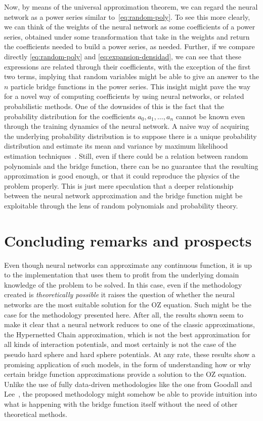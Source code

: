 Now, by means of the universal approximation theorem, we can regard the neural network
as a power series similar to~\eqref{eq:random-poly}. To see this more clearly, we
can think of the weights of the neural network as some coefficients of a power series,
obtained under some transformation that take in the weights and return the coefficients
needed to build a power series, as needed.
Further, if we compare directly \autoref{eq:random-poly}
and \autoref{eq:expansion-densidad}, we can see that these expressions
are related through their coefficients, with the exception of the first two terms, implying 
that random variables might be able to give an answer to the $n$ particle bridge functions 
in the power series.
This insight might pave the way for a novel way of computing coefficients
by using neural networks, or related probabilistic methods.
One of the downsides of this is the fact that the probability
distribution for the coefficients $a_0, a_1, \dots , a_n$ cannot be known even through the
training dynamics of the neural network. A naive way of acquiring the underlying 
probability distribution is to suppose there is
a unique probability distribution and estimate its mean and variance by maximum likelihood
estimation techniques~\cite{hastieElementsStatisticalLearning2009}.
Still, even if there could be a relation between random polynomials and the bridge 
function, there can be no guarantee that the resulting approximation is good enough, or 
that it could reproduce the physics of the problem properly.
This is just mere speculation that a deeper relationship between the neural network 
approximation and the bridge function might be exploitable through the lens of random
polynomials and probability theory.

\section{Concluding remarks and prospects}
Even though neural networks can approximate any continuous function,
it is up to the implementation that uses them
to profit from the underlying domain knowledge of the problem to be solved. In this case,
even if the methodology created is \emph{theoretically possible} it raises the question of
whether the neural networks are the most suitable solution for the OZ equation.
Such might be the case for the methodology presented here. After all, the results shown
seem to make it clear that a neural network reduces to one of the classic approximations,
the Hypernetted Chain approximation, which is not the best approximation for all kinds
of interaction potentials, and most certainly is not the case of the pseudo hard sphere
and hard sphere potentials.
At any rate, these results show a promising application of such models, in the form of
understanding how or why certain bridge function approximations provide a solution to the 
OZ equation. Unlike the use of fully data-driven methodologies like the one from
Goodall and Lee~\cite{goodallInferenceUniversalOrnsteinZernike},
the proposed methodology might somehow be able to provide intuition into what is happening
with the bridge function itself without the need of other theoretical methods.

